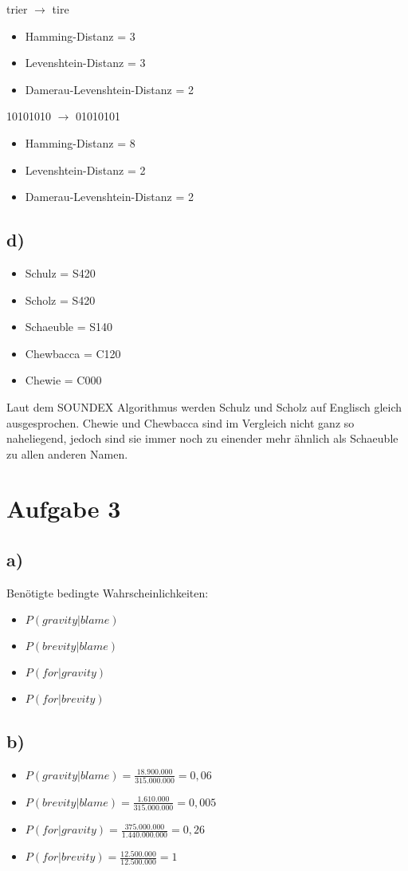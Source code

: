 \documentclass[11pt,a4paper,parskip=half ]{scrartcl}
\begin{document}
		trier $\rightarrow$ tire
		\begin{itemize}
			\item Hamming-Distanz = 3
			\item Levenshtein-Distanz = 3
			\item Damerau-Levenshtein-Distanz = 2
		\end{itemize}
		
		10101010 $\rightarrow$ 01010101
		\begin{itemize}
			\item Hamming-Distanz = 8
			\item Levenshtein-Distanz = 2
			\item Damerau-Levenshtein-Distanz = 2
		\end{itemize}
	
		\subsection*{d)}
		\begin{itemize}
			\item Schulz = S420
			\item Scholz = S420
			\item Schaeuble = S140
			\item Chewbacca = C120
			\item Chewie = C000
		\end{itemize}
		Laut dem SOUNDEX Algorithmus werden Schulz und Scholz auf Englisch gleich ausgesprochen. Chewie und Chewbacca sind im Vergleich nicht ganz so naheliegend, jedoch sind sie immer noch zu einender mehr ähnlich als Schaeuble zu allen anderen Namen.
		
		\section*{Aufgabe 3}
		\subsection*{a)} Benötigte bedingte Wahrscheinlichkeiten:
		\begin{itemize}
			\item $P(gravity|blame)$
			\item $P(brevity|blame)$
			\item $P(for|gravity)$
			\item $P(for|brevity)$
		\end{itemize}
	
		\subsection*{b)}
		\begin{itemize}
			\item $P(gravity|blame) = \frac{18.900.000}{315.000.000} = 0,06$
			\item $P(brevity|blame) = \frac{1.610.000}{315.000.000} = 0,005$
			\item $P(for|gravity) = \frac{375.000.000}{1.440.000.000} = 0,26$
			\item $P(for|brevity) = \frac{12.500.000}{12.500.000} = 1$
		\end{itemize}
	
\end{document}
